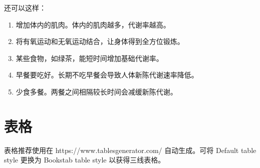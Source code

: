 \documentclass{article}
\begin{document}
还可以这样：

\begin{enumerate}[(1)]
	\item 增加体内的肌肉。体内的肌肉越多，代谢率越高。
	\item 将有氧运动和无氧运动结合，让身体得到全方位锻炼。
	\item 某些食物，如绿茶，能短时间增加基础代谢率。
	\item 早餐要吃好。长期不吃早餐会导致人体新陈代谢速率降低。
	\item 少食多餐。两餐之间相隔较长时间会减缓新陈代谢。
\end{enumerate}

\section{表格}

表格推荐使用在 https://www.tablesgenerator.com/ 自动生成。可将 Default table style 更换为 Bookstab table style 以获得三线表格。
\end{document}
